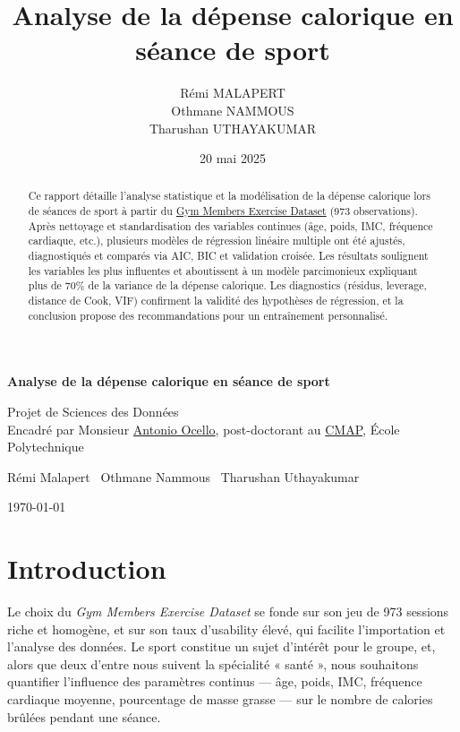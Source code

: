 \documentclass[12pt,a4paper]{article}
\title{Analyse de la dépense calorique en séance de sport}
\author{
  Rémi MALAPERT \\
  Othmane NAMMOUS \\
  Tharushan UTHAYAKUMAR
}
\date{20 mai 2025}
\begin{document}
\begin{titlepage}
\centering
\vspace*{2cm}
{\LARGE\bfseries Analyse de la dépense calorique
en séance de sport\par}
\vspace{1.5cm}
{\large Projet de Sciences des Données\\
Encadré par Monsieur \href{https://antonio-ocello.github.io/}{Antonio Ocello}, post-doctorant au \href{https://cmap.ip-paris.fr/}{CMAP}, École Polytechnique\par}
\vspace{2.5cm}
{\large
Rémi Malapert \
Othmane Nammous \
Tharushan Uthayakumar\par}
\vfill
{\large \today\par}
\end{titlepage}

\begin{abstract}
Ce rapport détaille l’analyse statistique et la modélisation de la dépense calorique
lors de séances de sport à partir du \href{https://www.kaggle.com/datasets/valakhorasani/gym-members-exercise-dataset}{Gym Members Exercise Dataset} (973 observations).
Après nettoyage et standardisation des variables continues (âge, poids, IMC, fréquence cardiaque, etc.),
plusieurs modèles de régression linéaire multiple ont été ajustés, diagnostiqués et comparés
via AIC, BIC et validation croisée. Les résultats soulignent les variables les plus influentes
et aboutissent à un modèle parcimonieux expliquant plus de 70\% de la variance de la dépense
calorique. Les diagnostics (résidus, leverage, distance de Cook, VIF) confirment la validité
des hypothèses de régression, et la conclusion propose des recommandations pour un entraînement
personnalisé.
\end{abstract}

\newpage

\tableofcontents
\newpage

\section{Introduction}
Le choix du \emph{Gym Members Exercise Dataset} se fonde sur son jeu de 973 sessions riche et homogène, et sur son taux d’usability élevé, qui facilite l’importation et l’analyse des données. Le sport constitue un sujet d’intérêt pour le groupe, et, alors que deux d’entre nous suivent la spécialité « santé », nous souhaitons quantifier l’influence des paramètres continus — âge, poids, IMC, fréquence cardiaque moyenne, pourcentage de masse grasse — sur le nombre de calories brûlées pendant une séance.
\end{document}
